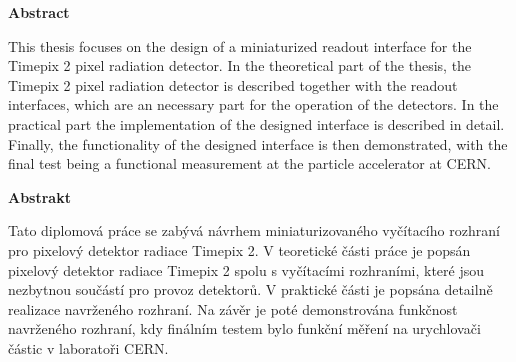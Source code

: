 \thispagestyle{plain}

\begin{center}
	\Large
	\textbf{Abstract}
\end{center}
This thesis focuses on the design of a miniaturized readout interface for the Timepix 2 pixel radiation detector. In the theoretical part of the thesis, the Timepix 2 pixel radiation detector is described together with the readout interfaces, which are an necessary part for the operation of the detectors. In the practical part the implementation of the designed interface is described in detail. Finally, the functionality of the designed interface is then demonstrated, with the final test being a functional measurement at the particle accelerator at CERN.


\hfill

\begin{center}
	\Large
	\textbf{Abstrakt}
\end{center}

Tato diplomová práce se zabývá návrhem miniaturizovaného vyčítacího rozhraní pro pixelový detektor radiace Timepix 2. V teoretické části práce je popsán pixelový detektor radiace Timepix 2 spolu s vyčítacími rozhraními, které jsou nezbytnou součástí pro provoz detektorů. V praktické části je popsána detailně realizace navrženého rozhraní. Na závěr je poté demonstrována funkčnost navrženého rozhraní, kdy finálním testem bylo funkční měření na urychlovači částic v laboratoři CERN.

